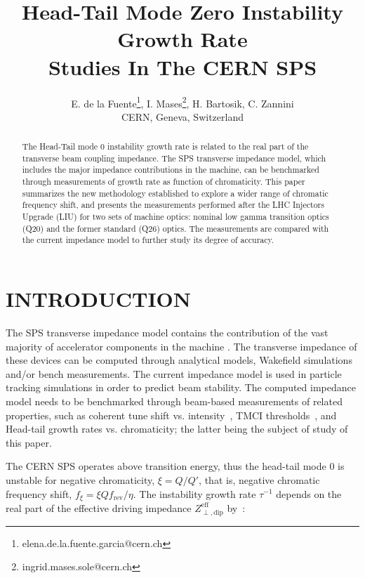 \documentclass[a4paper,
               keeplastbox,   %
               ]{jacow}
\begin{document}
\title{Head-Tail Mode Zero Instability Growth Rate \\ Studies 
In The CERN SPS}

\author{E. de la Fuente\thanks{elena.de.la.fuente.garcia@cern.ch}, I. Mases\thanks{ingrid.mases.sole@cern.ch}, H. Bartosik, C. Zannini \\ CERN, Geneva, Switzerland} 

\maketitle

%
\begin{abstract}
The Head-Tail mode 0 instability growth rate is related to the real part of the transverse beam coupling impedance. The SPS transverse impedance model, which includes the major impedance contributions in the machine, can be benchmarked through measurements of growth rate as function of chromaticity. This paper summarizes the new methodology established to explore a wider range of chromatic frequency shift, and presents the measurements performed after the LHC Injectors Upgrade (LIU) for two sets of machine optics: nominal low gamma transition optics (Q20) and the former standard (Q26) optics. The measurements are compared with the current impedance model to further study its degree of accuracy.   
\end{abstract}


\section{INTRODUCTION}
The SPS transverse impedance model contains the contribution of the vast majority of accelerator components in the machine \cite{salvant:ipac19-weypls1}. The transverse impedance of these devices can be computed through analytical models, Wakefield simulations and/or bench measurements\cite{Zannini:2013wjh}. The current impedance model is used in particle tracking simulations \cite{MounetDelphi, OeftigerPyHEADTAIL} in order to predict beam stability. The computed impedance model needs to be benchmarked through beam-based measurements of related properties, such as coherent tune shift vs. intensity~\cite{rumolo:tuneshift}, TMCI thresholds~\cite{Bartosik:2014ria}, and Head-tail growth rates vs. chromaticity; the latter being the subject of study of this paper.

The CERN SPS operates above transition energy, thus the head-tail mode 0 is unstable for negative chromaticity, $\xi=Q/Q'$, that is, negative chromatic frequency shift, $f_{\xi} = \xi Q f_\textrm{rev} / \eta$. The instability growth rate $\tau^{-1}$ depends on the real part of the effective driving impedance $Z^\textrm{eff}_{\perp, \textrm{dip}}$ by~\cite{Chao:book}:
\end{document}
